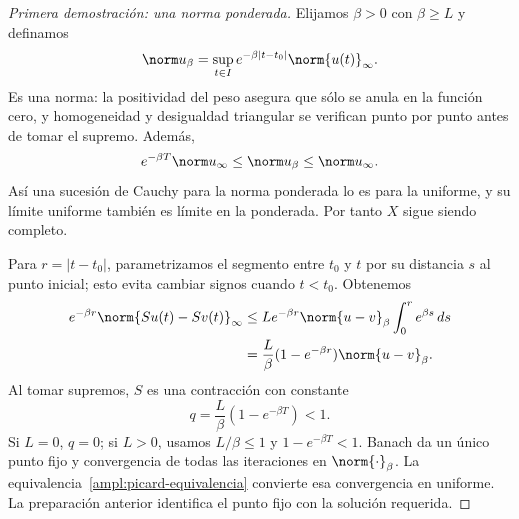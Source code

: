 \begin{proof}[Primera demostración: una norma ponderada]
Elijamos $\beta>0$ con $\beta\ge L$ y definamos
\[
 \norm u_\beta=\sup_{t\in I}e^{-\beta|t-t_0|}\norm{u(t)}_\infty.
\]
Es una norma: la positividad del peso asegura que sólo se anula en la función cero, y homogeneidad y desigualdad triangular se verifican punto por punto antes de tomar el supremo. Además,
\begin{equation}\label{ampl:picard-equivalencia}
 e^{-\beta T}\norm u_\infty\le\norm u_\beta\le\norm u_\infty.
\end{equation}
Así una sucesión de Cauchy para la norma ponderada lo es para la uniforme, y su límite uniforme también es límite en la ponderada. Por tanto $X$ sigue siendo completo.

Para $r=|t-t_0|$, parametrizamos el segmento entre $t_0$ y $t$ por su distancia $s$ al punto inicial; esto evita cambiar signos cuando $t<t_0$. Obtenemos
\[
 \begin{split}
 e^{-\beta r}\norm{Su(t)-Sv(t)}_\infty
 &\le L e^{-\beta r}\norm{u-v}_\beta\int_0^r e^{\beta s}\,ds\\
 &=\frac L\beta(1-e^{-\beta r})\norm{u-v}_\beta.
 \end{split}
\]
Al tomar supremos, $S$ es una contracción con constante
\begin{equation}\label{ampl:picard-constante}
 q=\frac L\beta(1-e^{-\beta T})<1.
\end{equation}
Si $L=0$, $q=0$; si $L>0$, usamos $L/\beta\le1$ y $1-e^{-\beta T}<1$. Banach da un único punto fijo y convergencia de todas las iteraciones en $\norm{\cdot}_\beta$. La equivalencia~\eqref{ampl:picard-equivalencia} convierte esa convergencia en uniforme. La preparación anterior identifica el punto fijo con la solución requerida.
\end{proof}


